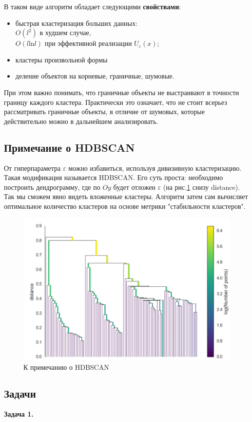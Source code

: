 В таком виде алгоритм обладает следующими \textbf{свойствами}:
\begin{itemize}
    \item быстрая кластеризация больших данных: \\$O(l^2)$ в худшем случае, \\ $O(l \mathrm{ln} l)$ при эффективной реализации $U_\varepsilon (x)$;
    \item кластеры произвольной формы
    \item деление объектов на корневые, граничные, шумовые.
\end{itemize}

При этом важно понимать, что граничные объекты не выстраивают в точности границу каждого кластера. Практически это означает, что не стоит всерьез рассматривать граничные объекты, в отличие от шумовых, которые действительно можно в дальнейшем анализировать.

\subsection{Примечание о HDBSCAN} 
От гиперпараметра $\varepsilon$ можно избавиться, используя дивизивную кластеризацию. Такая модификация называется HDBSCAN. Его суть проста: необходимо построить дендрограмму, где по $Oy$ будет отложен $\varepsilon$ (на рис.\ref{fig:hdbdendro} снизу distance). Так мы сможем явно видеть вложенные кластеры. Алгоритм затем сам вычисляет оптимальное количество кластеров на основе метрики "стабильности кластеров".

\begin{figure}[ht!]
    \centering
    \includegraphics[width=0.6\linewidth]{chapters/clustering/png/hdbscan_dendrogramm.png}
    \caption{К примечанию о HDBSCAN}
    \label{fig:hdbdendro}
\end{figure}
\subsection{Задачи}
\textbf{Задача 1.}


